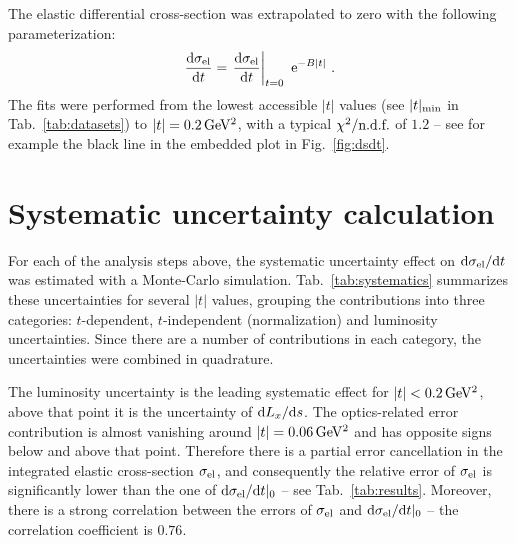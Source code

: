 \documentclass[doublecol]{../macros/epl2}
\def\d{{\rm d}}
\def\un#1{\,{\rm #1}}
\def\e{{\rm e}}
\begin{document}
The elastic differential cross-section was extrapolated to zero with the following parameterization:
\begin{equation}
\label{eq:extrapolation}
{\d\sigma_{\rm el}\over \d t} = \left. {\d\sigma_{\rm el}\over \d t}\right|_{t=0} \ \e^{-B|t|}\ .
\end{equation}
The fits were performed from the lowest accessible $|t|$ values (see $|t|_{\rm min}$ in Tab.~\ref{tab:datasets}) to $|t| = 0.2\un{GeV^2}$, with a typical $\chi^2/\hbox{n.d.f.}$ of $1.2$ -- see for example the black line in the embedded plot in Fig.~\ref{fig:dsdt}.

\section{Systematic uncertainty calculation}


For each of the analysis steps above, the systematic uncertainty effect on $\d\sigma_{\rm el}/\d t$ was estimated with a Monte-Carlo simulation. Tab.~\ref{tab:systematics} summarizes these uncertainties for several $|t|$ values, grouping the contributions into three categories: $t$-dependent, $t$-independent (normalization) and luminosity uncertainties. Since there are a number of contributions in each category, the uncertainties were combined in quadrature.

The luminosity uncertainty is the leading systematic effect for $|t| < 0.2\un{GeV^2}$, above that point it is the uncertainty of $\d L_x/\d s$. The optics-related error contribution is almost vanishing around $|t| = 0.06\un{GeV^2}$ and has opposite signs below and above that point. Therefore there is a partial error cancellation in the integrated elastic cross-section $\sigma_{\rm el}$, and consequently the relative error of $\sigma_{\rm el}$ is significantly lower than the one of $\d\sigma_{\rm el}/\d t|_0$ -- see Tab.~\ref{tab:results}. Moreover, there is a strong correlation between the errors of $\sigma_{\rm el}$ and $\d\sigma_{\rm el}/\d t|_0$ -- the correlation coefficient is $0.76$.
\end{document}
